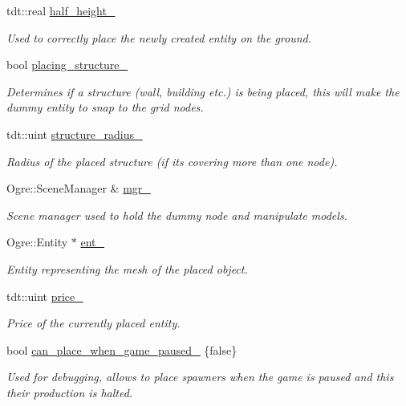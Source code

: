 \begin{DoxyCompactItemize}
tdt\+::real \hyperlink{class_entity_placer_a72d45d5edaff74b58a898a7ad1b518fc}{half\+\_\+height\+\_\+}
\begin{DoxyCompactList}\small\item\em Used to correctly place the newly created entity on the ground. \end{DoxyCompactList}\item 
bool \hyperlink{class_entity_placer_af3edb9c35afa51723737c9995bdd2f84}{placing\+\_\+structure\+\_\+}
\begin{DoxyCompactList}\small\item\em Determines if a structure (wall, building etc.) is being placed, this will make the dummy entity to snap to the grid nodes. \end{DoxyCompactList}\item 
tdt\+::uint \hyperlink{class_entity_placer_a329869555fb8492752f6deccf1678a98}{structure\+\_\+radius\+\_\+}
\begin{DoxyCompactList}\small\item\em Radius of the placed structure (if it\textquotesingle{}s covering more than one node). \end{DoxyCompactList}\item 
Ogre\+::\+Scene\+Manager \& \hyperlink{class_entity_placer_ad80a74a9b6ee426c6050b825d3c78aea}{mgr\+\_\+}
\begin{DoxyCompactList}\small\item\em Scene manager used to hold the dummy node and manipulate models. \end{DoxyCompactList}\item 
Ogre\+::\+Entity $\ast$ \hyperlink{class_entity_placer_ae0452120158b3f88eba7b913257f185a}{ent\+\_\+}
\begin{DoxyCompactList}\small\item\em Entity representing the mesh of the placed object. \end{DoxyCompactList}\item 
tdt\+::uint \hyperlink{class_entity_placer_a936cda73ed84004f4c7b339481c6124b}{price\+\_\+}
\begin{DoxyCompactList}\small\item\em Price of the currently placed entity. \end{DoxyCompactList}\item 
bool \hyperlink{class_entity_placer_a9c038f93f3f2d94e322b050a1eafef6e}{can\+\_\+place\+\_\+when\+\_\+game\+\_\+paused\+\_\+} \{false\}
\begin{DoxyCompactList}\small\item\em Used for debugging, allows to place spawners when the game is paused and this their production is halted. \end{DoxyCompactList}\end{DoxyCompactItemize}


